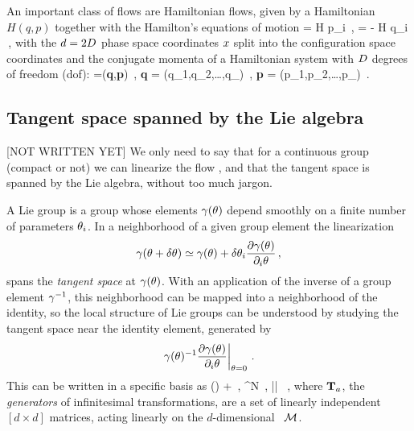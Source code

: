 An important class of flows are Hamiltonian flows,
given by a
Hamiltonian $H(q,p)$ together with the Hamilton's
equations of motion
\beq
{} = {\partial H \over \partial p_i}
    \,, \quad\quad  %
 = - {\partial H \over \partial q_i}
\,,
with the $d= 2\DOF$ phase space coordinates $\pSpace$ split into
the configuration space coordinates and the
conjugate momenta of a Hamiltonian system with $\DOF$ degrees of freedom
(dof):
\beq
\pSpace=({\bf q},{\bf p})
\,,\qquad
{\bf q} = (q_1,q_2,\dots,q_\DOF)
\,,\qquad
{\bf p} = (p_1,p_2,\dots,p_\DOF)
\,.

\subsection{Tangent space spanned by the Lie algebra}
\label{sect:tanSpace}

[NOT WRITTEN YET]
We only need to say that for a continuous group (compact or not) we can
linearize the flow , and that
the tangent space is spanned by the Lie algebra, without
too much jargon.

A Lie group is a group whose elements $\LieEl(\gSpace)$ depend smoothly
on a finite number of parameters $\gSpace_i$. In a neighborhood of a
given group element the linearization
\[
\LieEl(\gSpace+\delta\gSpace) \simeq \LieEl(\gSpace)
+ \delta\gSpace_i
	\frac{\partial \LieEl(\gSpace)}{\partial_i \gSpace}
\,,
\]
spans the \emph{tangent space}
at $\gamma(\theta)$. With an application of the inverse of a group
element $\gamma^{-1}$, this neighborhood can be mapped into a neighborhood
of the identity, so the
local structure of Lie groups can be understood
by studying the tangent space near the identity element,
generated by
\[
		\left.
	\gamma(\theta)^{-1}
	\frac{\partial \gamma(\theta)}{\partial_i \theta}
		\right|_{\theta=0}
\,.
\]
This can be written in a specific basis as
\beq
\LieEl(\delta\gSpace)  + \delta \gSpace \cdot \Lg
    \,,\quad
\delta\gSpace \in \reals^N
    \,,\quad
|\delta \gSpace| 
    \, ,
where $\mathbf{T}_a$, the {\em generators} of infinitesimal
transformations, are a set of linearly independent
$[d\!\times\!d]$ matrices,
acting linearly on the $d$-dim\-ens\-ion\-al
\statesp\ ${\cal M}$.

